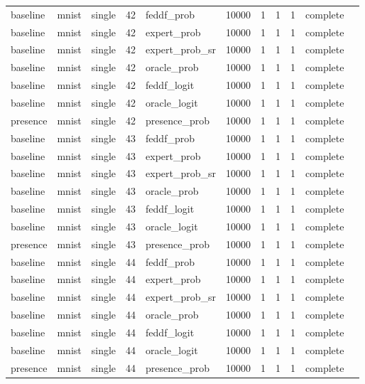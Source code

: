 \begin{tabular}{lllrlrrrrll}
baseline & mnist & single & 42 & feddf\_prob & 10000 & 1 & 1 & 1 & complete &  \\
baseline & mnist & single & 42 & expert\_prob & 10000 & 1 & 1 & 1 & complete &  \\
baseline & mnist & single & 42 & expert\_prob\_sr & 10000 & 1 & 1 & 1 & complete &  \\
baseline & mnist & single & 42 & oracle\_prob & 10000 & 1 & 1 & 1 & complete &  \\
baseline & mnist & single & 42 & feddf\_logit & 10000 & 1 & 1 & 1 & complete &  \\
baseline & mnist & single & 42 & oracle\_logit & 10000 & 1 & 1 & 1 & complete &  \\
presence & mnist & single & 42 & presence\_prob & 10000 & 1 & 1 & 1 & complete &  \\
baseline & mnist & single & 43 & feddf\_prob & 10000 & 1 & 1 & 1 & complete &  \\
baseline & mnist & single & 43 & expert\_prob & 10000 & 1 & 1 & 1 & complete &  \\
baseline & mnist & single & 43 & expert\_prob\_sr & 10000 & 1 & 1 & 1 & complete &  \\
baseline & mnist & single & 43 & oracle\_prob & 10000 & 1 & 1 & 1 & complete &  \\
baseline & mnist & single & 43 & feddf\_logit & 10000 & 1 & 1 & 1 & complete &  \\
baseline & mnist & single & 43 & oracle\_logit & 10000 & 1 & 1 & 1 & complete &  \\
presence & mnist & single & 43 & presence\_prob & 10000 & 1 & 1 & 1 & complete &  \\
baseline & mnist & single & 44 & feddf\_prob & 10000 & 1 & 1 & 1 & complete &  \\
baseline & mnist & single & 44 & expert\_prob & 10000 & 1 & 1 & 1 & complete &  \\
baseline & mnist & single & 44 & expert\_prob\_sr & 10000 & 1 & 1 & 1 & complete &  \\
baseline & mnist & single & 44 & oracle\_prob & 10000 & 1 & 1 & 1 & complete &  \\
baseline & mnist & single & 44 & feddf\_logit & 10000 & 1 & 1 & 1 & complete &  \\
baseline & mnist & single & 44 & oracle\_logit & 10000 & 1 & 1 & 1 & complete &  \\
presence & mnist & single & 44 & presence\_prob & 10000 & 1 & 1 & 1 & complete &  \\

\end{tabular}
